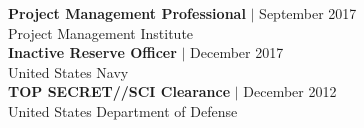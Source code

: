 
{\sc\textbf {Project Management Professional}} $\vert$ September 2017\\
{\color{gray} Project Management Institute }\\

{\sc\textbf {Inactive Reserve Officer}} $\vert$ December 2017\\
{\color{gray} United States Navy }\\

{\sc\textbf {TOP SECRET//SCI Clearance}} $\vert$ December 2012\\
{\color{gray} United States Department of Defense }\\

